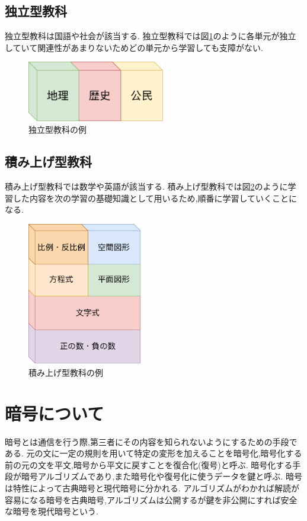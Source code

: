 \documentclass[a4j,12pt]{jsarticle}
\begin{document}
\subsection{独立型教科}
独立型教科は国語や社会が該当する.
独立型教科では図\ref{fig:01}のように各単元が独立していて関連性があまりないためどの単元から学習しても支障がない.
\begin{figure}[H]
\centering
\includegraphics[width=6cm]{01.pdf}
\caption{独立型教科の例}
\label{fig:01}
\end{figure} 

\subsection{積み上げ型教科}
積み上げ型教科では数学や英語が該当する.
積み上げ型教科では図\ref{fig:04}のように学習した内容を次の学習の基礎知識として用いるため,順番に学習していくことになる.

\begin{figure}[H]
\centering
\includegraphics[width=5cm]{04.pdf}
\caption{積み上げ型教科の例}
\label{fig:04}
\end{figure} 

\section{暗号について}
暗号とは通信を行う際,第三者にその内容を知られないようにするための手段である.
元の文に一定の規則を用いて特定の変形を加えることを暗号化,暗号化する前の元の文を平文,暗号から平文に戻すことを復合化(復号)と呼ぶ.
暗号化する手段が暗号アルゴリズムであり,また暗号化や復号化に使うデータを鍵と呼ぶ.
暗号は特性によって古典暗号と現代暗号に分かれる.
アルゴリズムがわかれば解読が容易になる暗号を古典暗号,アルゴリズムは公開するが鍵を非公開にすれば安全な暗号を現代暗号という.
\end{document}
